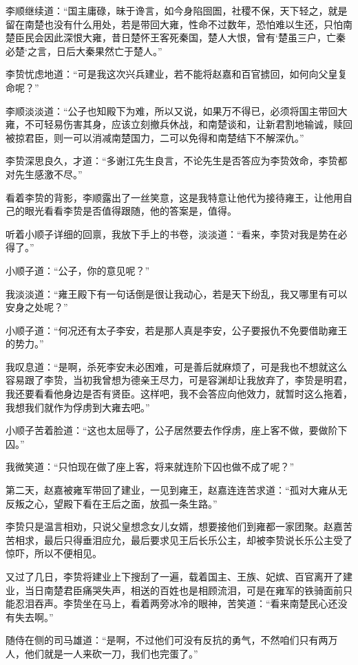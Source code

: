 李顺继续道：“国主庸碌，昧于谗言，如今身陷囹圄，社稷不保，天下轻之，就是留在南楚也没有什么用处，若是带回大雍，性命不过数年，恐怕难以生还，只怕南楚臣民会因此深恨大雍，昔日楚怀王客死秦国，楚人大恨，曾有‘楚虽三户，亡秦必楚‘之言，日后大秦果然亡于楚人。”

李贽忧虑地道：“可是我这次兴兵建业，若不能将赵嘉和百官掳回，如何向父皇复命呢？”

李顺淡淡道：“公子也知殿下为难，所以又说，如果万不得已，必须将国主带回大雍，不可轻易伤害其身，应该立刻撤兵休战，和南楚谈和，让新君割地输诚，赎回被掠君臣，则一可以消减南楚国力，二可以免得和南楚结下不解深仇。”

李贽深思良久，才道：“多谢江先生良言，不论先生是否答应为李贽效命，李贽都对先生感激不尽。”

看着李贽的背影，李顺露出了一丝笑意，这是我特意让他代为接待雍王，让他用自己的眼光看看李贽是否值得跟随，他的答案是，值得。

听着小顺子详细的回禀，我放下手上的书卷，淡淡道：“看来，李贽对我是势在必得了。”

小顺子道：“公子，你的意见呢？”

我淡淡道：“雍王殿下有一句话倒是很让我动心，若是天下纷乱，我又哪里有可以安身之处呢？”

小顺子道：“何况还有太子李安，若是那人真是李安，公子要报仇不免要借助雍王的势力。”

我叹息道：“是啊，杀死李安未必困难，可是善后就麻烦了，可是我也不想就这么容易跟了李贽，当初我曾想为德亲王尽力，可是容渊却让我放弃了，李贽是明君，我还要看看他身边是否有贤臣。这样吧，我不会答应向他效力，就暂时这么拖着，我想我们就作为俘虏到大雍去吧。”

小顺子苦着脸道：“这也太屈辱了，公子居然要去作俘虏，座上客不做，要做阶下囚。”

我微笑道：“只怕现在做了座上客，将来就连阶下囚也做不成了呢？”

第二天，赵嘉被雍军带回了建业，一见到雍王，赵嘉连连苦求道：“孤对大雍从无反叛之心，望殿下看在王后之面，放孤一条生路。”

李贽只是温言相劝，只说父皇想念女儿女婿，想要接他们到雍都一家团聚。赵嘉苦苦相求，最后只得垂泪应允，最后要求见王后长乐公主，却被李贽说长乐公主受了惊吓，所以不便相见。

又过了几日，李贽将建业上下搜刮了一遍，载着国主、王族、妃嫔、百官离开了建业，当日南楚君臣痛哭失声，相送的百姓也是相顾流泪，可是在雍军的铁骑面前只能忍泪吞声。李贽坐在马上，看着两旁冰冷的眼神，苦笑道：“看来南楚民心还没有失去啊。”

随侍在侧的司马雄道：“是啊，不过他们可没有反抗的勇气，不然咱们只有两万人，他们就是一人来砍一刀，我们也完蛋了。”

